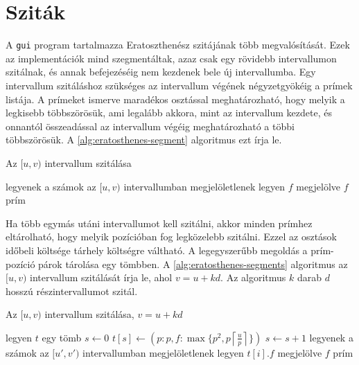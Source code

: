 \section{Sziták}
\label{sec:szitak}

A \texttt{gui} program tartalmazza Eratoszthenész szitájának több megvalósítását.
Ezek az implementációk mind szegmentáltak, azaz csak egy rövidebb intervallumon szitálnak,
és annak befejezéséig nem kezdenek bele új intervallumba.
Egy intervallum szitáláshoz szükséges az intervallum végének négyzetgyökéig a prímek listája.
A prímeket ismerve maradékos osztással meghatározható, hogy melyik a legkisebb többszörösük, ami legalább akkora, mint az intervallum kezdete, és onnantól összeadással az intervallum végéig meghatározható a többi többszörösük.
A \ref{alg:eratosthenes-segment} algoritmus ezt írja le.

\begin{algorithm}
\caption{Az $[u, v)$ intervallum szitálása}
\label{alg:eratosthenes-segment}
\begin{algorithmic}[1]
\State legyenek a számok az $[u, v)$ intervallumban megjelöletlenek
		\State legyen $f$ megjelölve
	\EndFor
\EndFor
\For{$f \in [u, v)$}
		\State $f$ prím
	\EndIf
\EndFor
\end{algorithmic}
\end{algorithm}

Ha több egymás utáni intervallumot kell szitálni, akkor minden prímhez eltárolható, hogy melyik pozícióban fog legközelebb szitálni.
Ezzel az osztások időbeli költsége tárhely költségre váltható.
A legegyszerűbb megoldás a prím-pozíció párok tárolása egy tömbben.
A \ref{alg:eratosthenes-segments} algoritmus az $[u, v)$ intervallum szitálását írja le, ahol $v=u+kd$. Az algoritmus $k$ darab $d$ hosszú részintervallumot szitál.

\begin{algorithm}
\caption{Az $[u, v)$ intervallum szitálása, $v=u+kd$}
\label{alg:eratosthenes-segments}
\begin{algorithmic}[1]
\State legyen $t$ egy tömb
\State $s \gets 0$ 
	\State $t[s] \gets (p: p, f: \max \lbrace p^2, p \left \lceil{\frac{u}{p}}\right \rceil \rbrace )$
	\State $s \gets s+1$
\EndFor
{}
	\State legyenek a számok az $[u', v')$ intervallumban megjelöletlenek
			\State legyen $t[i].f$ megjelölve
		\EndFor
	\EndFor
	\For{$f \in [u', v')$}
			\State $f$ prím
		\EndIf
	\EndFor
\EndFor
\end{algorithmic}
\end{algorithm}

